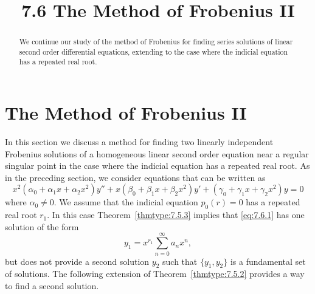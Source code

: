 \documentclass{ximera}
\title{7.6 The Method of Frobenius II}%
\begin{document}
\begin{abstract}
We continue our study of the method of Frobenius for finding series solutions of linear second order differential equations, extending to the case where the indicial equation has a repeated real root.
\end{abstract}

\maketitle

\section*{The Method of Frobenius II}

In this section we discuss a method for finding two linearly
independent Frobenius solutions of a homogeneous linear second order
equation near a regular singular point in the case where the indicial
equation has a repeated real root. As in the preceding section, we
consider equations that can be written as
\begin{equation} \label{eq:7.6.1}
x^2(\alpha_0+\alpha_1x+\alpha_2x^2)y''+x(\beta_0+\beta_1x+\beta_2x^2)y'
+(\gamma_0+\gamma_1x+\gamma_2x^2)y=0
\end{equation}
where $\alpha_0\ne0$. We assume that the indicial equation $p_0(r)=0$
has a repeated real root $r_1$. In this case Theorem~\ref{thmtype:7.5.3}
implies that \eqref{eq:7.6.1} has one solution of the form
$$
y_1=x^{r_1}\sum_{n=0}^\infty a_nx^n,
$$
but does not provide a second solution $y_2$ such that $\{y_1,y_2\}$
is a fundamental set of solutions. The following extension of
Theorem~\ref{thmtype:7.5.2} provides a way to find a second solution.
\end{document}
